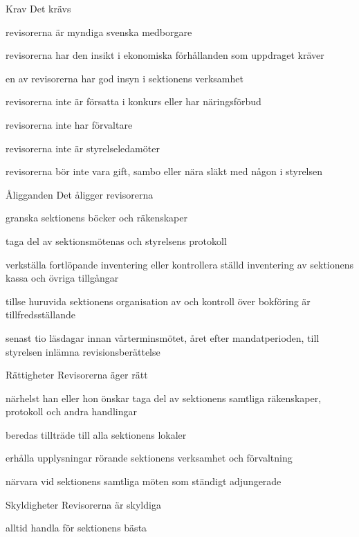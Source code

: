 \documentclass[pdfbookmarks,a4paper,11pt]{article}
\newlength{\itemcollength}
\newenvironment{reglemlista}{%
  \begin{list}{}{%
      \setlength{\labelwidth}{\itemcollength}%
      \setlength{\leftmargin}{\labelwidth + \labelsep}%
      \renewcommand{\makelabel}[1]{%
        \raisebox{0pt}[1ex][0pt]{%
          \makebox[\labelwidth][l]{%
            \parbox[t]{\itemcollength}{%
              \raggedright\hspace{0pt}##1}}}\hfill}%
      }}{%
  \end{list}}
\begin{document}
\begin{reglemlista}

	\item[Krav]
	Det krävs
	\begin{attlista}
		\item revisorerna är myndiga svenska medborgare
		\item revisorerna har den insikt i ekonomiska förhållanden som uppdraget kräver
		\item en av revisorerna har god insyn i sektionens verksamhet
		\item revisorerna inte är försatta i konkurs eller har näringsförbud
		\item revisorerna inte har förvaltare
		\item revisorerna inte är styrelseledamöter
		\item revisorerna bör inte vara gift, sambo eller nära släkt med någon i styrelsen
	\end{attlista}

	\item[Åligganden]
	Det åligger revisorerna
	\begin{attlista}
		\item granska sektionens böcker och räkenskaper
		\item taga del av sektionsmötenas och styrelsens protokoll
		\item verkställa fortlöpande inventering eller kontrollera ställd inventering av sektionens kassa och övriga tillgångar
		\item tillse huruvida sektionens organisation av och kontroll över bokföring är tillfredsställande
		\item senast tio läsdagar innan vårterminsmötet, året
		efter mandatperioden, till styrelsen inlämna revisionsberättelse
	\end{attlista}

	\item[Rättigheter]
	Revisorerna äger rätt
	\begin{attlista}
		\item närhelst han eller hon önskar taga del av sektionens samtliga räkenskaper, protokoll och andra handlingar
		\item beredas tillträde till alla sektionens lokaler
		\item erhålla upplysningar rörande sektionens verksamhet och förvaltning
		\item närvara vid sektionens samtliga möten som ständigt adjungerade
	\end{attlista}

	\item[Skyldigheter]
	Revisorerna är skyldiga
	\begin{attlista}
		\item alltid handla för sektionens bästa
	\end{attlista}

\end{reglemlista}
\end{document}
